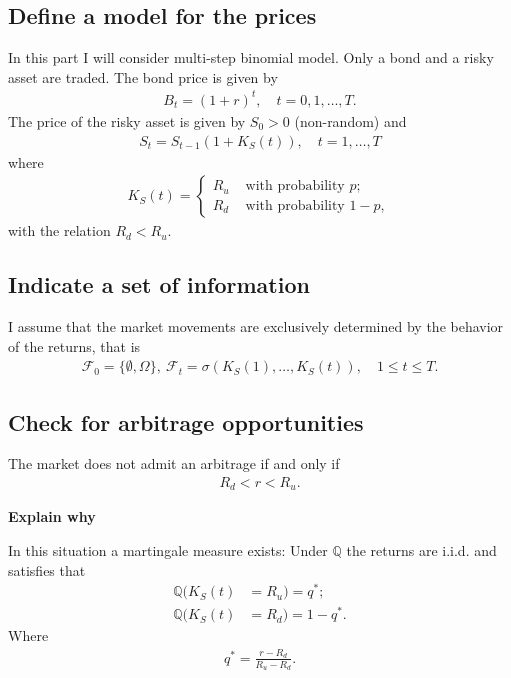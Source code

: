 \documentclass{article}
\theoremstyle{definition}
\numberwithin{equation}{section}
\newcommand{\taskcolor}{RedOrange}
\newcommand{\task}[1]{
    \begin{center}
        \colorbox{\taskcolor}{
            \textsf{
                \textbf{#1}
            }
        }
    \end{center}
}
\begin{document}
\subsection{Define a model for the prices}
In this part I will consider multi-step binomial model. 
Only a bond and a risky asset are traded. 
The bond price is given by
\begin{align}
    B_t = (1+r)^t, \quad t= 0,1, \ldots, T.
\end{align}
The price of the risky asset is given by $S_0 > 0$ (non-random) and 
\begin{align}
    S_t = S_{t-1} (1 + K_S(t)), \quad t = 1, \ldots, T
\end{align}
where 
\begin{align}
    K_S(t) = 
    \begin{cases} 
        R_u & \text{ with probability } p;\\ 
        R_d & \text{ with probability } 1 - p,
    \end{cases}
\end{align}
with the relation $R_d < R_u$. 

\subsection{Indicate a set of information}
I assume that the market movements are exclusively determined by the behavior of the returns, that is
\begin{align}
    \mathscr{F}_0 = \{\emptyset, \Omega\}, \ \mathscr{F}_t = \sigma(K_S(1), \ldots, K_S(t)), \quad 1 \leq t \leq T. 
\end{align}

\subsection{Check for arbitrage opportunities}
The market does not admit an arbitrage if and only if
\begin{align}
    R_d < r < R_u. 
\end{align}
\task{Explain why}
In this situation a martingale measure exists: Under $\mathbb{Q}$ the returns are i.i.d. and satisfies that 
\begin{align}
    \mathbb{Q}(K_S(t) &= R_u) = q^*;\\
    \mathbb{Q}(K_S(t) &= R_d) = 1 - q^*. 
\end{align}
Where
\begin{align}
    q^* = \frac{r - R_d}{R_u - R_d}. 
\end{align}
\end{document}
